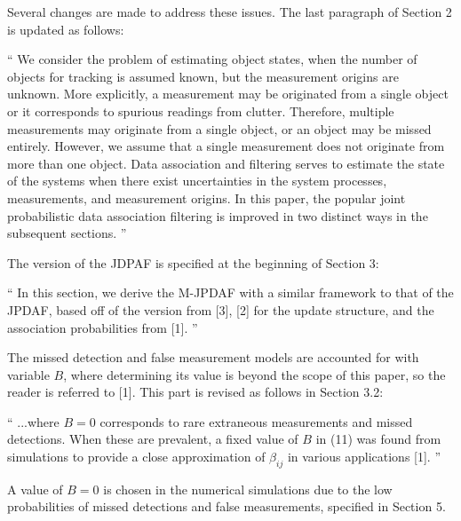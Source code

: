 \documentclass[11pt]{article}
\newenvironment{correction}{\begin{list}{}{\setlength{\leftmargin}{1cm}\setlength{\rightmargin}{1cm}}\vspace{\parsep}\item[]``}{''\end{list}}
\begin{document}
\begin{itemize}
Several changes are made to address these issues. The last paragraph of Section 2 is updated as follows:
\begin{correction}
We consider the problem of estimating object states, when the number of objects for tracking is assumed known, but the measurement origins are unknown. More explicitly, a measurement may be originated from a single object or it corresponds to spurious readings from clutter. Therefore, multiple measurements may originate from a single object, or an object may be missed entirely.
However, we assume that a single measurement does not originate from more than one object.
Data association and filtering serves to estimate the state of the systems when there exist uncertainties in the system processes, measurements, and measurement origins. In this paper, the popular joint probabilistic data association filtering is improved in two distinct ways in the subsequent sections.
\end{correction}
The version of the JDPAF is specified at the beginning of Section 3:
\begin{correction}
In this section, we derive the M-JPDAF with a similar framework to that of the JPDAF, based off of the version from [3], [2] for the update structure, and the association probabilities from [1].
\end{correction}
The missed detection and false measurement models are accounted for with variable $B$, where determining its value is beyond the scope of this paper, so the reader is referred to [1]. This part is revised as follows in Section 3.2:
\begin{correction}
...where $B=0$ corresponds to rare extraneous measurements and missed detections. When these are prevalent, a fixed value of $B$ in (11) was found from simulations to provide a close approximation of $\beta_{ij}$ in various applications [1].
\end{correction}
A value of $B=0$ is chosen in the numerical simulations due to the low probabilities of missed detections and false measurements, specified in Section 5.


\end{itemize}
\end{document}
